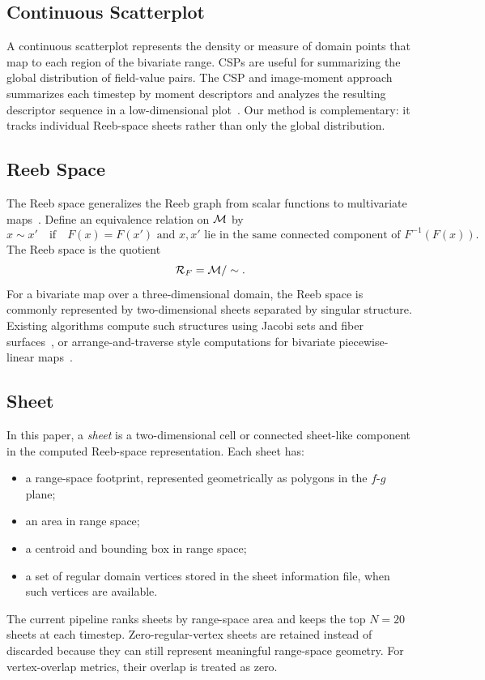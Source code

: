 \subsection{Continuous Scatterplot}

A continuous scatterplot represents the density or measure of domain points
that map to each region of the bivariate range. CSPs are useful for summarizing
the global distribution of field-value pairs. The CSP and image-moment approach
summarizes each timestep by moment descriptors and analyzes the resulting
descriptor sequence in a low-dimensional plot~\cite{sharma2025csp}. Our method
is complementary: it tracks individual Reeb-space sheets rather than only the
global distribution.

\subsection{Reeb Space}

The Reeb space generalizes the Reeb graph from scalar functions to multivariate
maps~\cite{edelsbrunner2008reebspaces}. Define an equivalence relation on
\(\mathcal{M}\) by
\[
x\sim x' \quad \text{if} \quad F(x)=F(x') \text{ and } x,x'
\text{ lie in the same connected component of } F^{-1}(F(x)).
\]
The Reeb space is the quotient
\[
\mathcal{R}_F = \mathcal{M}/\sim.
\]
For a bivariate map over a three-dimensional domain, the Reeb space is commonly
represented by two-dimensional sheets separated by singular structure. Existing
algorithms compute such structures using Jacobi sets and fiber
surfaces~\cite{tierny2017jacobi}, or arrange-and-traverse style computations
for bivariate piecewise-linear maps~\cite{hristov2026singular}.

\subsection{Sheet}

In this paper, a \emph{sheet} is a two-dimensional cell or connected sheet-like
component in the computed Reeb-space representation. Each sheet has:
\begin{itemize}
  \item a range-space footprint, represented geometrically as polygons in the
  \(f\)-\(g\) plane;
  \item an area in range space;
  \item a centroid and bounding box in range space;
  \item a set of regular domain vertices stored in the sheet information file,
  when such vertices are available.
\end{itemize}
The current pipeline ranks sheets by range-space area and keeps the top
\(N=20\) sheets at each timestep. Zero-regular-vertex sheets are retained
instead of discarded because they can still represent meaningful range-space
geometry. For vertex-overlap metrics, their overlap is treated as zero.


